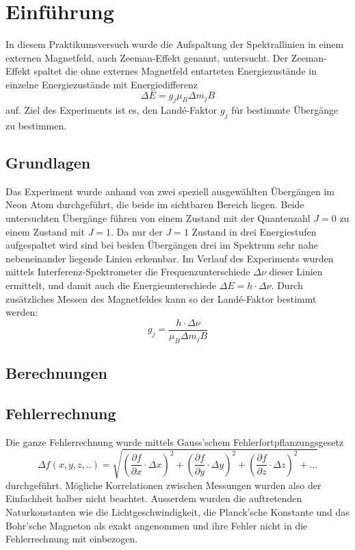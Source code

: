 \documentclass[a4paper,parskip,11pt, DIV12]{scrreprt}
\begin{document}
	
	
		\chapter{Einführung}
	
	In diesem Praktikumsversuch wurde die Aufspaltung der Spektrallinien in einem externen Magnetfeld, auch Zeeman-Effekt genannt, untersucht. Der Zeeman-Effekt spaltet die ohne externes Magnetfeld entarteten Energiezustände in einzelne Energiezustände mit Energiedifferenz
	\begin{equation}
	\label{Energiedifferenz}
	\Delta E = g_j \mu_B \Delta m_j B 
	\end{equation}
auf. Ziel des Experiments ist es, den Landé-Faktor $g_j $ für bestimmte Übergänge zu bestimmen. 
	\section{Grundlagen}
	Das Experiment wurde anhand von zwei speziell ausgewählten Übergängen im Neon Atom durchgeführt, die beide im sichtbaren Bereich liegen. Beide untersuchten Übergänge führen von einem Zustand mit der Quantenzahl $ J = 0 $ zu einem Zustand mit $J = 1$. Da nur der $J = 1$ Zustand in drei Energiestufen aufgespaltet wird sind bei beiden Übergängen drei im Spektrum sehr nahe nebeneinander liegende Linien erkennbar. Im Verlauf des Experiments wurden mittels Interferenz-Spektrometer die Frequenzunterschiede $\Delta \nu$  dieser Linien ermittelt, und damit auch die Energieunterschiede $\Delta E = h \cdot \Delta \nu$. Durch zusätzliches Messen des Magnetfeldes kann so der Landé-Faktor bestimmt werden:
	\begin{equation}
	\label{Landé-Faktor}
	g_j = \frac{h \cdot \Delta \nu}{\mu_B \Delta m_j B}
	\end{equation}
		\section{Berechnungen}
	\section{Fehlerrechnung}
	Die ganze Fehlerrechnung wurde mittels Gauss'schem Fehlerfortpflanzungsgesetz 
	\begin{equation}
	\label{Fehlerfortpflanzungsgesetz}
	\Delta f(x,y,z,..) = \sqrt{(\frac{\partial f}{\partial x} \cdot \Delta x)^2+(\frac{\partial f}{\partial y} \cdot \Delta y)^2+(\frac{\partial f}{\partial z} \cdot \Delta z)^2+...}
	\end{equation}
	durchgeführt. Mögliche Korrelationen zwischen Messungen wurden also der Einfachheit halber nicht beachtet. Ausserdem wurden die auftretenden Naturkonstanten wie die Lichtgeschwindigkeit, die Planck'sche Konstante und das Bohr'sche Magneton als exakt angenommen und ihre Fehler nicht in die Fehlerrechnung mit einbezogen.  
\end{document}
